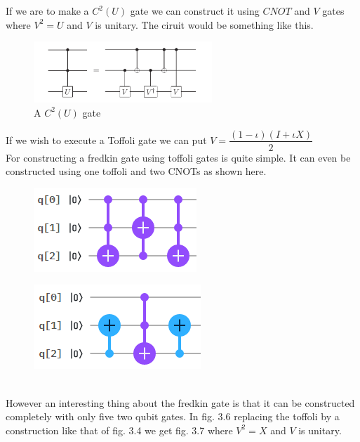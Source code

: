 \documentclass{report}
\begin{document}
If we are to make a $C^2(U)$ gate we can construct it using $CNOT$ and $V$ gates where $V^2 = U$ and $V$ is unitary. The ciruit would be something like this.
\begin{figure}[ht]
    \centering
    \includegraphics[width = 0.6\textwidth]{images/unitary 2 control.png}
    \caption{A $C^2(U)$ gate}
\end{figure}
If we wish to execute a Toffoli gate we can put $V = \dfrac{(1 - \iota)(I + \iota{X})}{2}$\\
For constructing a fredkin gate using toffoli gates is quite simple. It can even be constructed using one toffoli and two CNOTs as shown here.\\
\begin{figure}[ht]
\centering
\begin{minipage}{.5\textwidth}
\centering
\includegraphics[width=.5\linewidth]{images/fredkin with toffoli.png}
\label{fig:test1}
\end{minipage}%
\begin{minipage}{.5\textwidth}
\centering
\includegraphics[width=.5\linewidth]{images/fredkin with cnot.png}
\label{fig:test2}
\end{minipage}
\end{figure}\\
However an interesting thing about the fredkin gate is that it can be constructed completely with only five two qubit gates. In fig. 3.6 replacing the toffoli by a construction like that of fig. 3.4 we get fig. 3.7 where $V^2 = X$ and $V$ is unitary.\\
\end{document}
